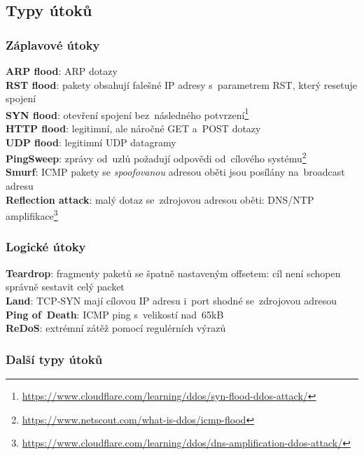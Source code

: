\subsection{Typy útoků}

\subsubsection{Záplavové útoky}

\textbf{ARP flood}: ARP dotazy \\
\textbf{RST flood}: pakety obsahují falešné IP adresy s~parametrem RST, který resetuje spojení \\
\textbf{SYN flood}: otevření spojení bez~následného potvrzení\footnote{\url{https://www.cloudflare.com/learning/ddos/syn-flood-ddos-attack/}} \\
\textbf{HTTP flood}: legitimní, ale náročné GET a~POST dotazy \\
\textbf{UDP flood}: legitimní UDP datagramy \\
\textbf{PingSweep}: zprávy od~uzlů požadují odpovědi od~cílového systému\footnote{\url{https://www.netscout.com/what-is-ddos/icmp-flood}} \\
\textbf{Smurf}: ICMP pakety se \emph{spoofovanou} adresou oběti jsou posílány na~broadcast adresu \\
\textbf{Reflection attack}: malý dotaz se~zdrojovou adresou oběti: DNS/NTP amplifikace\footnote{\url{https://www.cloudflare.com/learning/ddos/dns-amplification-ddos-attack/}}
 

\subsubsection{Logické útoky}

\textbf{Teardrop}: fragmenty paketů se špatně nastaveným offsetem: cíl není schopen správně sestavit celý packet \\
\textbf{Land}: TCP-SYN mají cílovou IP adresu i~port shodné se~zdrojovou adresou \\
\textbf{Ping of~Death}: ICMP ping s~velikostí nad~65kB \\
\textbf{ReDoS}: extrémní zátěž pomocí regulérních výrazů

\subsubsection{Další typy útoků}

